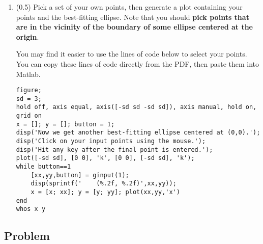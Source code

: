\documentclass[11pt,titlepage,fleqn]{article}
\begin{document}
\begin{enumerate}
\begin{enumerate}

\item Check that the result is the same as if you simply use the ``\verb+\+'' command: \verb+m = G\d+.

\item Produce a plot showing both the data and the best-fitting ellipse.

\end{enumerate}


\item (0.5) Pick a set of your own points, then generate a plot containing your points and the best-fitting ellipse. Note that you should {\bf pick points that are in the vicinity of the boundary of some ellipse centered at the origin}.

You may find it easier to use the lines of code below to select your points. You can copy these lines of code directly from the PDF, then paste them into Matlab.

\small
\begin{spacing}{1.0}
\begin{verbatim}
figure;
sd = 3;
hold off, axis equal, axis([-sd sd -sd sd]), axis manual, hold on, grid on
x = []; y = []; button = 1;
disp('Now we get another best-fitting ellipse centered at (0,0).');
disp('Click on your input points using the mouse.');
disp('Hit any key after the final point is entered.');
plot([-sd sd], [0 0], 'k', [0 0], [-sd sd], 'k');
while button==1
    [xx,yy,button] = ginput(1);
    disp(sprintf('    (%.2f, %.2f)',xx,yy));
    x = [x; xx]; y = [y; yy]; plot(xx,yy,'x')
end
whos x y
\end{verbatim}
\end{spacing}

\end{enumerate}


\subsection*{Problem} \howmuchtime\




\end{document}
